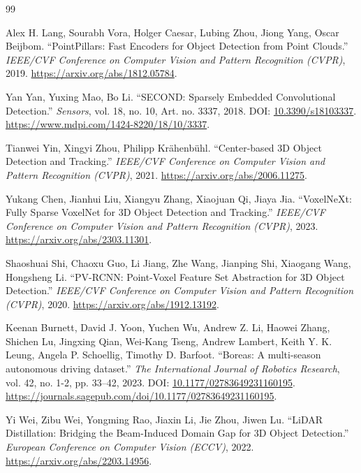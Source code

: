 \documentclass[10pt,twocolumn]{article}
\begin{document}
\clearpage
\begin{thebibliography}{99}

 Alex H. Lang, Sourabh Vora, Holger Caesar, Lubing Zhou, Jiong Yang, Oscar Beijbom. ``PointPillars: Fast Encoders for Object Detection from Point Clouds.'' \textit{IEEE/CVF Conference on Computer Vision and Pattern Recognition (CVPR)}, 2019. \url{https://arxiv.org/abs/1812.05784}.

 Yan Yan, Yuxing Mao, Bo Li. ``SECOND: Sparsely Embedded Convolutional Detection.'' \textit{Sensors}, vol. 18, no. 10, Art. no. 3337, 2018. DOI: \href{https://doi.org/10.3390/s18103337}{10.3390/s18103337}. \url{https://www.mdpi.com/1424-8220/18/10/3337}.

 Tianwei Yin, Xingyi Zhou, Philipp Krähenbühl. ``Center-based 3D Object Detection and Tracking.'' \textit{IEEE/CVF Conference on Computer Vision and Pattern Recognition (CVPR)}, 2021. \url{https://arxiv.org/abs/2006.11275}.

 Yukang Chen, Jianhui Liu, Xiangyu Zhang, Xiaojuan Qi, Jiaya Jia. ``VoxelNeXt: Fully Sparse VoxelNet for 3D Object Detection and Tracking.'' \textit{IEEE/CVF Conference on Computer Vision and Pattern Recognition (CVPR)}, 2023. \url{https://arxiv.org/abs/2303.11301}.

 Shaoshuai Shi, Chaoxu Guo, Li Jiang, Zhe Wang, Jianping Shi, Xiaogang Wang, Hongsheng Li. ``PV-RCNN: Point-Voxel Feature Set Abstraction for 3D Object Detection.'' \textit{IEEE/CVF Conference on Computer Vision and Pattern Recognition (CVPR)}, 2020. \url{https://arxiv.org/abs/1912.13192}.

 Keenan Burnett, David J. Yoon, Yuchen Wu, Andrew Z. Li, Haowei Zhang, Shichen Lu, Jingxing Qian, Wei-Kang Tseng, Andrew Lambert, Keith Y. K. Leung, Angela P. Schoellig, Timothy D. Barfoot. ``Boreas: A multi-season autonomous driving dataset.'' \textit{The International Journal of Robotics Research}, vol. 42, no. 1-2, pp. 33--42, 2023. DOI: \href{https://doi.org/10.1177/02783649231160195}{10.1177/02783649231160195}. \url{https://journals.sagepub.com/doi/10.1177/02783649231160195}.

 Yi Wei, Zibu Wei, Yongming Rao, Jiaxin Li, Jie Zhou, Jiwen Lu. ``LiDAR Distillation: Bridging the Beam-Induced Domain Gap for 3D Object Detection.'' \textit{European Conference on Computer Vision (ECCV)}, 2022. \url{https://arxiv.org/abs/2203.14956}.


\end{thebibliography}
\end{document}
